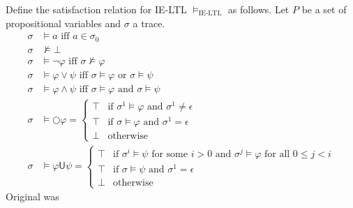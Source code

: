 \documentclass[a4paper]{article}
\newcommand{\U}{\mathsf{U}}
\newcommand{\tand}{\text{ and }}
\newcommand{\tor}{\text{ or }}
\newcommand{\tiff}{\text{ iff }}
\newcommand{\fsome}{\text{ for some }}
\newcommand{\fall}{\text{ for all }}
\begin{document}
\begin{defn}\label{ieltlsemfull}

  Define the satisfaction relation for IE-LTL $\vDash_{\text{IE-LTL}}$ as follows.
  Let $P$ be a set of propositional variables and $\sigma$ a trace.
  \begin{align*}
    \sigma &\vDash a \tiff a \in \sigma_0\\
    \sigma &\nvDash \bot\\
    \sigma &\vDash \neg \varphi \tiff \sigma \nvDash \varphi\\
    \sigma &\vDash \varphi \lor \psi \tiff \sigma \vDash \varphi \tor \sigma \vDash \psi\\
    \sigma &\vDash \varphi \land \psi \tiff \sigma \vDash \varphi \tand \sigma \vDash \psi\\
    \sigma &\vDash \bigcirc \varphi =
    \begin{cases}
      \top &\text{if } \sigma^1 \vDash \varphi \tand \sigma^1 \ne \epsilon\\
      \top &\text{if } \sigma \vDash \varphi \tand \sigma^1 = \epsilon\\
      \bot &\text{otherwise}
    \end{cases}\\
    \sigma &\vDash \varphi \U \psi =
    \begin{cases}
      \top &\text{if } \sigma^i \vDash \psi \fsome i > 0 \tand \sigma^j \vDash \varphi \fall 0 \leq j < i\\
      \top &\text{if } \sigma \vDash \psi \tand \sigma^1 = \epsilon\\
      \bot &\text{otherwise}
    \end{cases}
  \end{align*}
  Original was 
\end{defn}
\end{document}
